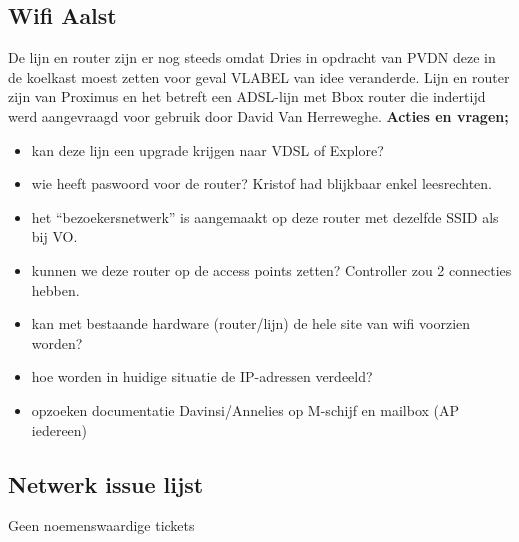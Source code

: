 \documentclass[11pt]{article}
\begin{document}
\subsection{Wifi Aalst}
\label{sec:orgbf863c3}
De lijn en router zijn er nog steeds omdat Dries in opdracht van PVDN deze in de koelkast moest zetten voor geval VLABEL van idee veranderde. Lijn en router zijn van Proximus en het betreft een ADSL-lijn met Bbox router die indertijd werd aangevraagd voor gebruik door David Van Herreweghe.
\textbf{Acties en vragen;}
\begin{itemize}
\item kan deze lijn een upgrade krijgen naar VDSL of Explore?
\item wie heeft paswoord voor de router? Kristof had blijkbaar enkel leesrechten.
\item het ``bezoekersnetwerk'' is aangemaakt op deze router met dezelfde SSID als bij VO.
\item kunnen we deze router op de access points zetten? Controller zou 2 connecties hebben.
\item kan met bestaande hardware (router/lijn) de hele site van wifi voorzien worden?
\item hoe worden in huidige situatie de IP-adressen verdeeld?
\item opzoeken documentatie Davinsi/Annelies op M-schijf en mailbox (AP iedereen)
\end{itemize}
\subsection{Netwerk issue lijst}
\label{sec:orga50d600}
Geen noemenswaardige tickets
\end{document}
